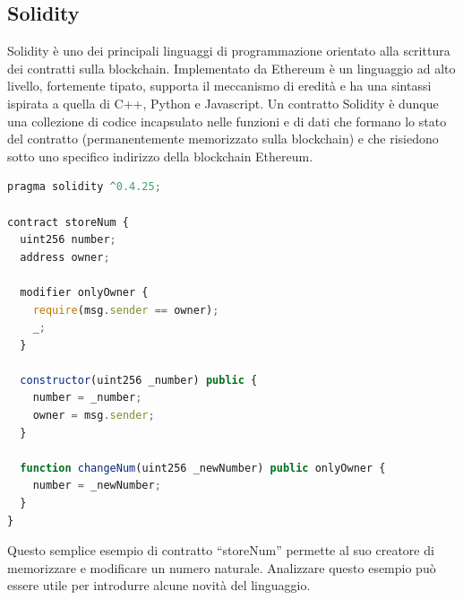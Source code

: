 \subsection{Solidity}

Solidity è uno dei principali linguaggi di programmazione orientato alla scrittura dei contratti sulla blockchain. Implementato da Ethereum è un linguaggio ad alto livello, fortemente tipato, supporta il meccanismo di eredità e ha una sintassi ispirata a quella di C++, Python e Javascript.
Un contratto Solidity è dunque una collezione di codice incapsulato nelle funzioni e di dati che formano lo stato del contratto (permanentemente memorizzato sulla blockchain) e che risiedono sotto uno specifico indirizzo della blockchain Ethereum.
\\
\begin{lstlisting}[caption={Esempio contratto Solidity},language=JavaScript]
pragma solidity ^0.4.25;

contract storeNum {
  uint256 number;
  address owner;

  modifier onlyOwner { 
    require(msg.sender == owner);
    _;
  }
  
  constructor(uint256 _number) public {
    number = _number;
    owner = msg.sender;
  }

  function changeNum(uint256 _newNumber) public onlyOwner {
    number = _newNumber;
  }
}
\end{lstlisting}

Questo semplice esempio di contratto “storeNum” permette al suo creatore di memorizzare e modificare un numero naturale. Analizzare questo esempio può essere utile per introdurre alcune novità del linguaggio.

